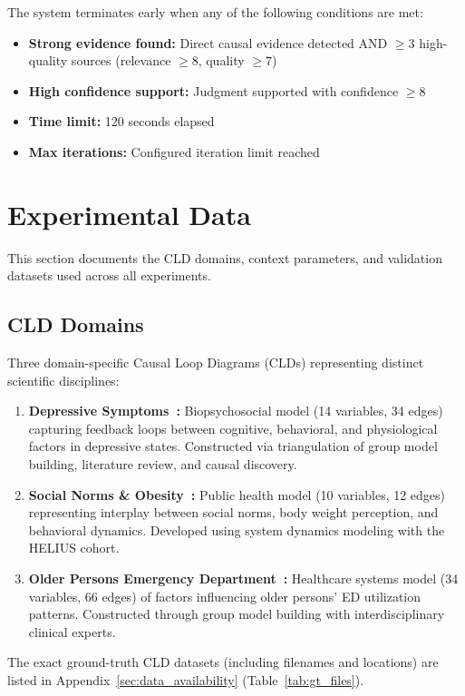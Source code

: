 The system terminates early when any of the following conditions are met:
\begin{itemize}[noitemsep]
    \item \textbf{Strong evidence found:} Direct causal evidence detected AND $\geq$3 high-quality sources (relevance $\geq 8$, quality $\geq 7$)
    \item \textbf{High confidence support:} Judgment supported with confidence $\geq 8$
    \item \textbf{Time limit:} 120 seconds elapsed
    \item \textbf{Max iterations:} Configured iteration limit reached
\end{itemize}

\section{Experimental Data}
\label{sec:experimental_data}

This section documents the CLD domains, context parameters, and validation datasets used across all experiments.

\subsection{CLD Domains}
Three domain-specific Causal Loop Diagrams (CLDs) representing distinct scientific disciplines:
\begin{enumerate}[noitemsep]
    \item \textbf{Depressive Symptoms~\cite{uleman2024triangulation}:} Biopsychosocial model (14 variables, 34 edges) capturing feedback loops between cognitive, behavioral, and physiological factors in depressive states. Constructed via triangulation of group model building, literature review, and causal discovery.
    \item \textbf{Social Norms \& Obesity~\cite{crielaard2020socialnorms}:} Public health model (10 variables, 12 edges) representing interplay between social norms, body weight perception, and behavioral dynamics. Developed using system dynamics modeling with the HELIUS cohort.
    \item \textbf{Older Persons Emergency Department~\cite{smeekes2023emergency}:} Healthcare systems model (34 variables, 66 edges) of factors influencing older persons' ED utilization patterns. Constructed through group model building with interdisciplinary clinical experts.
\end{enumerate}
The exact ground-truth CLD datasets (including filenames and locations) are listed in Appendix~\ref{sec:data_availability} (Table~\ref{tab:gt_files}).

